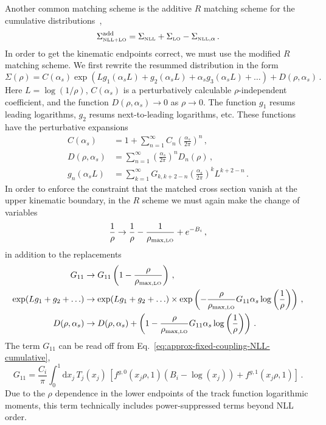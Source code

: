 \documentclass[letterpaper,11pt]{article}
\newcommand{\Eq}[1]{Eq.~\eqref{#1}}
\begin{document}
Another common matching scheme is the additive $R$ matching scheme for the cumulative distributions~\cite{Catani:1992ua},
\begin{equation}
\label{eq:matching-add}
\Sigma^{\rm add}_{\mbox{\tiny NLL+LO}} = \Sigma_{\mbox{\tiny NLL}} + \Sigma_{\mbox{\tiny LO}} - \Sigma_{\mbox{\tiny NLL},\alpha}  \,.
\end{equation}
In order to get the kinematic endpoints correct, we must use the modified $R$ matching scheme. 
%
We first rewrite the resummed distribution in the form \cite{Catani:1992ua}
\begin{equation}
\label{eq:nll-cumulative-dist-alternate}
\Sigma(\rho) = C(\alpha_s) \exp \left( Lg_1\left(\alpha_s L\right) + g_2\left(\alpha_s L\right)+ \alpha_s g_3\left(\alpha_s L\right)+ \ldots\right) + D(\rho,\alpha_s)\,.
\end{equation}
Here $L = \log(1/\rho)$, $C(\alpha_s)$ is a perturbatively calculable $\rho$-independent coefficient, and the function $D(\rho,\alpha_s) \rightarrow 0$ as $\rho\rightarrow 0$. 
%
The function $g_1$ resums leading logarithms, $g_2$ resums next-to-leading logarithms, etc. 
%
These functions have the perturbative expansions
\begin{align}
\label{eq:factorization-expansion}
C(\alpha_s) &= 1+\sum_{n=1}^\infty C_n\left(\frac{\alpha_s}{2\pi}\right)^n\,,\\
D(\rho,\alpha_s) &= \sum_{n=1}^\infty \left(\frac{\alpha_s}{2\pi}\right)^n D_n(\rho)\,,\\
g_n(\alpha_s L) &= \sum_{k=1}^\infty G_{k,k+2-n}\left(\frac{\alpha_s}{2\pi}\right)^k L^{k+2-n}\,.
\end{align}
In order to enforce the constraint that the matched cross section vanish at the upper kinematic boundary, in the $R$ scheme we must again make the change of variables
\begin{equation}
\frac{1}{\rho} \rightarrow \frac{1}{\rho} - \frac{1}{\rho_{\mbox{\scriptsize max,\tiny LO}}} + e^{-B_i}\,,
\end{equation}
in addition to the replacements \cite{Catani:1992ua}
\begin{align}
G_{11} &\rightarrow G_{11}\left(1-\frac{\rho}{\rho_{\mbox{\scriptsize max,\tiny LO}}}\right)\,,\\
\exp(Lg_1 + g_2 + \ldots) &\rightarrow \exp(Lg_1 + g_2 + \ldots)  \times \exp\left(-\frac{\rho}{\rho_{\mbox{\scriptsize max,\tiny LO}}}G_{11}\alpha_s \log\left(\frac{1}{\rho}\right) \right)\,,
\\
D(\rho,\alpha_s) &\rightarrow  D(\rho,\alpha_s) + \left(1-\frac{\rho}{\rho_{\mbox{\scriptsize max,\tiny LO}}}G_{11}\alpha_s \log\left(\frac{1}{\rho}\right) \right)\,.
\end{align}
The term $G_{11}$ can be read off from \Eq{eq:approx-fixed-coupling-NLL-cumulative},
\begin{equation}
G_{11} = \frac{C_i}{\pi} \int_0^1 \text{d}x_j\, T_j(x_j) \,\left[ f^{g,0}(x_j\rho,1) \left(B_i - \log(x_j)\right) +f^{g,1}(x_j\rho,1)\right]\,.
\end{equation}
Due to the $\rho$ dependence in the lower endpoints of the track function logarithmic moments, this term technically includes power-suppressed terms beyond NLL order. 
\end{document}
